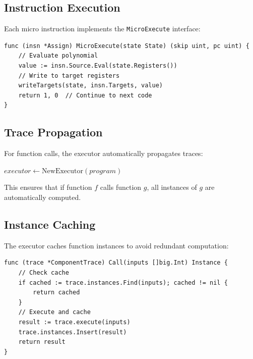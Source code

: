 \documentclass[11pt,a4paper]{article}
\begin{document}
\subsection{Instruction Execution}

Each micro instruction implements the \texttt{MicroExecute} interface:

\begin{lstlisting}[style=golang,caption={Micro Execution Interface}]
func (insn *Assign) MicroExecute(state State) (skip uint, pc uint) {
    // Evaluate polynomial
    value := insn.Source.Eval(state.Registers())
    // Write to target registers
    writeTargets(state, insn.Targets, value)
    return 1, 0  // Continue to next code
}
\end{lstlisting}

\subsection{Trace Propagation}

For function calls, the executor automatically propagates traces:

\begin{algorithm}
\caption{Trace Propagation}
\begin{algorithmic}[1]
    \State $executor \gets \text{NewExecutor}(program)$
    \State {}
            \State {}
        \EndFor
    \EndFor
    \State \Return {}
\EndFunction
\end{algorithmic}
\end{algorithm}

This ensures that if function $f$ calls function $g$, all instances of $g$ are automatically computed.

\subsection{Instance Caching}

The executor caches function instances to avoid redundant computation:

\begin{lstlisting}[style=golang,caption={Instance Caching}]
func (trace *ComponentTrace) Call(inputs []big.Int) Instance {
    // Check cache
    if cached := trace.instances.Find(inputs); cached != nil {
        return cached
    }
    // Execute and cache
    result := trace.execute(inputs)
    trace.instances.Insert(result)
    return result
}
\end{lstlisting}
\end{document}

